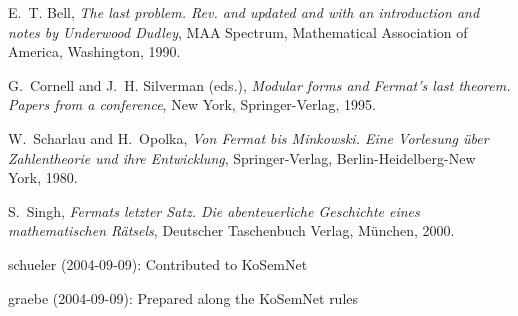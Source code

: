 \documentclass[11pt]{article}
\begin{document}
\begin{thebibliography}{1}

E.~T. Bell, \emph{The last problem. Rev. and updated and with an introduction
  and notes by Underwood Dudley}, MAA Spectrum, Mathematical Association of
  America, Washington, 1990.

G.~Cornell and J.~H. Silverman (eds.), \emph{Modular forms and Fermat's last
  theorem. Papers from a conference}, New York, Springer-Verlag, 1995.

W.~Scharlau and H.~Opolka, \emph{Von {F}ermat bis {M}inkowski. Eine {V}orlesung
  {\"u}ber {Z}ahlentheorie und ihre {E}ntwicklung}, Springer-Verlag,
  Berlin-Heidelberg-New York, 1980.

S.~Singh, \emph{Fermats letzter Satz. Die abenteuerliche Geschichte eines
  mathematischen R{\" a}tsels}, Deutscher Taschenbuch Verlag, M{\" u}nchen,
  2000.

\end{thebibliography}
\begin{attribution}
schueler (2004-09-09): Contributed to KoSemNet

graebe (2004-09-09): Prepared along the KoSemNet rules
\end{attribution}
\end{document}
